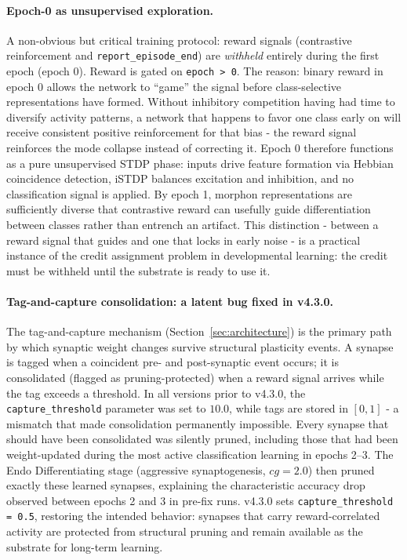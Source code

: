 \paragraph{Epoch-0 as unsupervised exploration.}
A non-obvious but critical training protocol: reward signals (contrastive reinforcement and \texttt{report\_episode\_end}) are \emph{withheld} entirely during the first epoch (epoch 0). Reward is gated on \texttt{epoch > 0}. The reason: binary reward in epoch 0 allows the network to ``game'' the signal before class-selective representations have formed. Without inhibitory competition having had time to diversify activity patterns, a network that happens to favor one class early on will receive consistent positive reinforcement for that bias - the reward signal reinforces the mode collapse instead of correcting it. Epoch 0 therefore functions as a pure unsupervised STDP phase: inputs drive feature formation via Hebbian coincidence detection, iSTDP balances excitation and inhibition, and no classification signal is applied. By epoch 1, morphon representations are sufficiently diverse that contrastive reward can usefully guide differentiation between classes rather than entrench an artifact. This distinction - between a reward signal that guides and one that locks in early noise - is a practical instance of the credit assignment problem in developmental learning: the credit must be withheld until the substrate is ready to use it.

\paragraph{Tag-and-capture consolidation: a latent bug fixed in v4.3.0.}
The tag-and-capture mechanism (Section~\ref{sec:architecture}) is the primary path by which synaptic weight changes survive structural plasticity events. A synapse is tagged when a coincident pre- and post-synaptic event occurs; it is consolidated (flagged as pruning-protected) when a reward signal arrives while the tag exceeds a threshold. In all versions prior to v4.3.0, the \texttt{capture\_threshold} parameter was set to $10.0$, while tags are stored in $[0, 1]$ - a mismatch that made consolidation permanently impossible. Every synapse that should have been consolidated was silently pruned, including those that had been weight-updated during the most active classification learning in epochs 2--3. The Endo Differentiating stage (aggressive synaptogenesis, $cg = 2.0$) then pruned exactly these learned synapses, explaining the characteristic accuracy drop observed between epochs 2 and 3 in pre-fix runs. v4.3.0 sets \texttt{capture\_threshold = 0.5}, restoring the intended behavior: synapses that carry reward-correlated activity are protected from structural pruning and remain available as the substrate for long-term learning.

